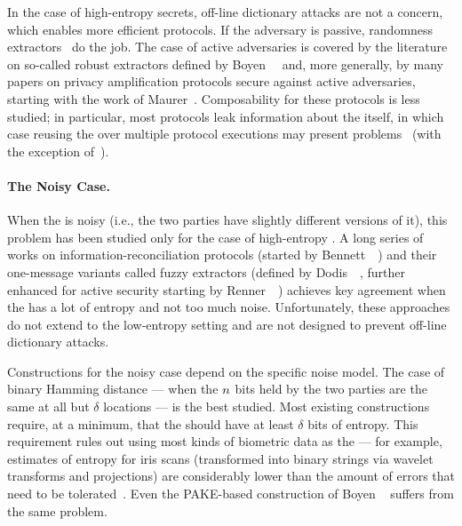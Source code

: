In the case of high-entropy secrets, off-line dictionary attacks are not a concern, which enables more efficient protocols. 
If the adversary is passive, randomness extractors~\cite{STOC:NisZuc93} do the job.
The case of active adversaries is covered by the literature on so-called robust extractors defined by Boyen~\etal~\cite{EC:BDKOS05} and, more generally, by many papers on privacy amplification protocols secure against active adversaries, starting with the work of Maurer~\cite{EC:Maurer97}.
Composability for these protocols is less studied; in particular, most protocols leak information about the \password itself, in which case reusing the \password over multiple protocol executions may present problems~\cite{CCS:Boyen04} (with the exception of~\cite{EC:CFPRS16}).

\paragraph{The Noisy Case.}
When the \password is noisy (i.e., the two parties have slightly different versions of it), 
this problem has been studied only for the case of high-entropy \passwords. 
A long series of works on information-reconciliation protocols (started by Bennett~\etal~\cite{bennett1988privacy}) and
their one-message variants called fuzzy extractors 
(defined by Dodis~\etal~\cite{DBLP:journals/siamcomp/DodisORS08}, further enhanced for active security starting by Renner~\etal~\cite{EC:RenWol04}) 
achieves key agreement when the \password has a lot of entropy and not too much noise. 
Unfortunately, these approaches do not extend to the low-entropy setting and are not designed to prevent off-line dictionary attacks.

Constructions for the noisy case depend on the specific noise model. 
The case of binary Hamming distance --- when the $n$ \password bits held by the two parties are the same at all but $\delta$ locations --- is the best studied. 
Most existing constructions require, at a minimum, that the \password should have at least $\delta$ bits of entropy. 
This requirement rules out using most kinds of biometric data as the \password --- for example, estimates of entropy for iris scans (transformed into binary strings via wavelet transforms and projections) are considerably lower than the amount of errors that need to be tolerated~\cite[Section 5]{blanton2009biometric}. 
Even the PAKE-based construction of Boyen \etal~\cite{EC:BDKOS05} suffers from the same problem.


